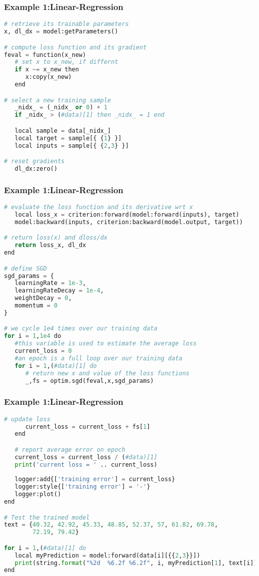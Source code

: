 \begin{frame}[fragile]
\MyLogo
\frametitle{Example 1:Linear-Regression}  
\ContinueLineNumber
\scriptsize{
\begin{lstlisting}[language=python]
# retrieve its trainable parameters
x, dl_dx = model:getParameters()

# compute loss function and its gradient 
feval = function(x_new)
   # set x to x_new, if differnt
   if x ~= x_new then
      x:copy(x_new)
   end

# select a new training sample
   _nidx_ = (_nidx_ or 0) + 1
   if _nidx_ > (#data)[1] then _nidx_ = 1 end

   local sample = data[_nidx_]
   local target = sample[{ {1} }]    
   local inputs = sample[{ {2,3} }] 

# reset gradients
   dl_dx:zero()
\end{lstlisting}
}
\end{frame}

\begin{frame}[fragile]
\MyLogo
\frametitle{Example 1:Linear-Regression}  
\ContinueLineNumber
\scriptsize{
\begin{lstlisting}[language=python]
# evaluate the loss function and its derivative wrt x
   local loss_x = criterion:forward(model:forward(inputs), target)
   model:backward(inputs, criterion:backward(model.output, target))

# return loss(x) and dloss/dx
   return loss_x, dl_dx
end

# define SGD 
sgd_params = {
   learningRate = 1e-3,
   learningRateDecay = 1e-4,
   weightDecay = 0,
   momentum = 0
}

# we cycle 1e4 times over our training data
for i = 1,1e4 do
   #this variable is used to estimate the average loss
   current_loss = 0
   #an epoch is a full loop over our training data
   for i = 1,(#data)[1] do
      # return new x and value of the loss functions
      _,fs = optim.sgd(feval,x,sgd_params)
\end{lstlisting}
}
\end{frame}

\begin{frame}[fragile]
\MyLogo
\frametitle{Example 1:Linear-Regression}  
\ContinueLineNumber
\scriptsize{
\begin{lstlisting}[language=python]
      # update loss       
      current_loss = current_loss + fs[1]
   end

   # report average error on epoch
   current_loss = current_loss / (#data)[1]
   print('current loss = ' .. current_loss)
   
   logger:add{['training error'] = current_loss}
   logger:style{['training error'] = '-'}
   logger:plot()  
end

# Test the trained model
text = {40.32, 42.92, 45.33, 48.85, 52.37, 57, 61.82, 69.78, 
        72.19, 79.42}

for i = 1,(#data)[1] do
   local myPrediction = model:forward(data[i][{{2,3}}])
   print(string.format("%2d  %6.2f %6.2f", i, myPrediction[1], text[i]))
end
\end{lstlisting}
}
\end{frame}

